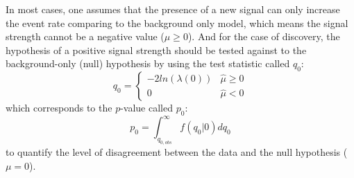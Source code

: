 In most cases, one assumes that the presence of a new signal can only increase the event rate comparing to the background only model,
which means the signal strength cannot be a negative value ($\mu \ge 0$).
And for the case of discovery, the hypothesis of a positive signal strength should be tested against to the background-only (null) hypothesis by using the test statistic called $q_0$:
\begin{equation} \label{eq:q0}
    q_0 = 
    \begin{cases}
        -2 ln(\lambda(0)) &\hat{\mu} \ge 0 \\
        0                 &\hat{\mu} < 0
    \end{cases}
\end{equation}
which corresponds to the $p$-value called $p_0$:
\begin{equation}
    p_0 = \int_{q_{0, obs}}^{\infty} f(q_0|0) d q_0
\end{equation}
to quantify the level of disagreement between the data and the null hypothesis ($\mu = 0$).
